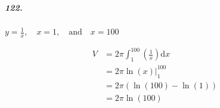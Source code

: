 


\renewcommand\assignment{Homework Set IV, Due February 2, 2023: \S 2.3 \# 122, 124, 130}


    \iffalse
    \begin{equation*}
        \begin{gathered}
            Equations go here.
        \end{gathered}
    \end{equation*}

    \resizebox{\hsize}{!}{$Long equation goes here$}

    \begin{multicol*}{# of columns}
    \end{multicol*}

    \horizontal

    \fi


    \subparagraph*{122.} $y = \frac{1}{x}, \quad x = 1, \quad \text{and} \quad x = 100$

    \begin{multicols}{2} 
        \centering{}

        \columnbreak

        \begin{align*}
            V & = 2\pi\int_{1}^{100}\left(\frac{1}{x}\right)\mathrm{d}x  \\
              & = 2\pi\ln(x)\Big|_{1}^{100}                              \\
              & = 2\pi(\ln(100) - \ln(1))                                \\
              & = \boxed{2\pi\ln(100)}
        \end{align*}
    \end{multicols}

